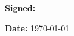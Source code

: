 \begin{sffamily}
\bigskip
\textbf{Signed:} \@author

\bigskip
\textbf{Date:} \today
\vspace{\fill}

\makeatother

\end{sffamily}
\onehalfspacing

\fi
